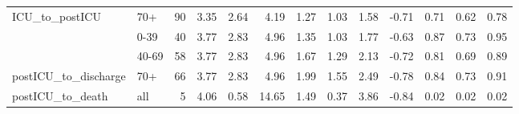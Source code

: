 \begin{tabular}[t]{llrrrrrrrrrrr}
\multirow{-2}{*}{\raggedright\arraybackslash ICU\_to\_postICU} & 70+ & 90 & 3.35 & 2.64 & 4.19 & 1.27 & 1.03 & 1.58 & -0.71 & 0.71 & 0.62 & 0.78\\
\cmidrule{1-13}
 & 0-39 & 40 & 3.77 & 2.83 & 4.96 & 1.35 & 1.03 & 1.77 & -0.63 & 0.87 & 0.73 & 0.95\\
\cmidrule{2-13}
 & 40-69 & 58 & 3.77 & 2.83 & 4.96 & 1.67 & 1.29 & 2.13 & -0.72 & 0.81 & 0.69 & 0.89\\
\cmidrule{2-13}
\multirow{-3}{*}{\raggedright\arraybackslash postICU\_to\_discharge} & 70+ & 66 & 3.77 & 2.83 & 4.96 & 1.99 & 1.55 & 2.49 & -0.78 & 0.84 & 0.73 & 0.91\\
\cmidrule{1-13}
postICU\_to\_death & all & 5 & 4.06 & 0.58 & 14.65 & 1.49 & 0.37 & 3.86 & -0.84 & 0.02 & 0.02 & 0.02\\
\bottomrule
\end{tabular}